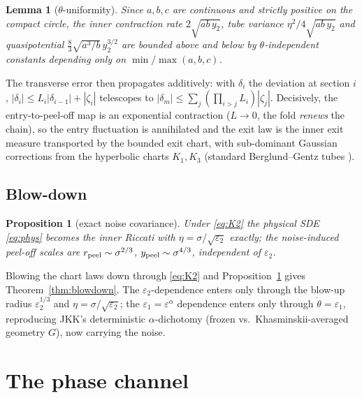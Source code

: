 \documentclass[11pt,reqno]{amsart}
\theoremstyle{plain}
\newtheorem{proposition}[theorem]{Proposition}
\newtheorem{lemma}[theorem]{Lemma}
\theoremstyle{definition}
\theoremstyle{remark}
\newcommand{\ep}{\varepsilon}
\begin{document}
\begin{lemma}[$\theta$-uniformity]\label{lem:theta}
Since $a,b,c$ are continuous and strictly positive on the compact circle, the inner
contraction rate $2\sqrt{ab\,y_2}$, tube variance $\eta^2/4\sqrt{ab\,y_2}$ and quasipotential
$\tfrac83\sqrt{a^3/b}\,y_2^{3/2}$ are bounded above and below by $\theta$-independent
constants depending only on $\min/\max(a,b,c)$.
\end{lemma}

The transverse error then propagates additively: with $\delta_i$ the deviation at section
$i$, $|\delta_i|\le L_i|\delta_{i-1}|+|\zeta_i|$ telescopes to $|\delta_m|\le\sum_j(\prod_{i>j}
L_i)|\zeta_j|$. Decisively, the entry-to-peel-off map is an exponential contraction
($L\to0$, the fold \emph{renews} the chain), so the entry fluctuation is annihilated and the
exit law is the inner exit measure transported by the bounded exit chart, with sub-dominant
Gaussian corrections from the hyperbolic charts $K_1,K_3$ (standard Berglund--Gentz tubes
\cite{BG,BGK}).

\subsection{Blow-down}
\begin{proposition}[exact noise covariance]\label{prop:noise}
Under \eqref{eq:K2} the physical SDE \eqref{eq:phys} becomes the inner Riccati with
$\eta=\sigma/\sqrt{\ep_2}$ exactly; the noise-induced peel-off scales are
$r_{\rm peel}\sim\sigma^{2/3}$, $y_{\rm peel}\sim\sigma^{4/3}$, independent of $\ep_2$.
\end{proposition}

Blowing the chart laws down through \eqref{eq:K2} and Proposition~\ref{prop:noise} gives
Theorem~\ref{thm:blowdown}. The $\ep_2$-dependence enters only through the blow-up radius
$\ep_2^{1/3}$ and $\eta=\sigma/\sqrt{\ep_2}$; the $\ep_1=\ep^\alpha$ dependence enters only
through $\dot\theta=\ep_1$, reproducing JKK's deterministic $\alpha$-dichotomy (frozen vs.\
Khasminskii-averaged geometry $G$), now carrying the noise.

\section{The phase channel}\label{sec:phase}
\end{document}
